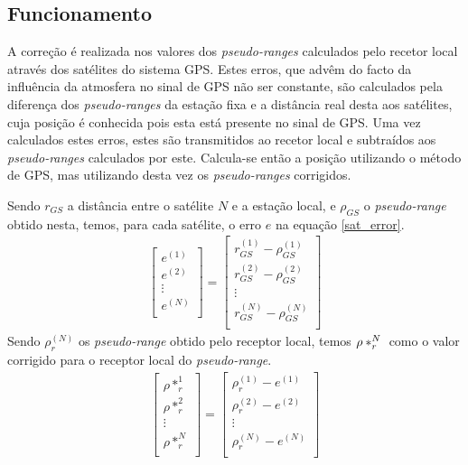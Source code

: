 \documentclass{article}
\begin{document}
\subsection{Funcionamento}

A correção é realizada nos valores dos \textit{pseudo-ranges}
calculados pelo recetor local através dos satélites do sistema GPS.
Estes erros, que advêm do facto da influência da atmosfera no sinal
de GPS não ser constante, são calculados pela diferença dos
\textit{pseudo-ranges} da estação fixa e a distância real desta aos
satélites, cuja posição é conhecida pois esta está presente no sinal
de GPS. Uma vez calculados estes erros, estes são transmitidos ao
recetor local e subtraídos aos \textit{pseudo-ranges} calculados por
este. Calcula-se então a posição utilizando o método de GPS, mas
utilizando desta vez os \textit{pseudo-ranges} corrigidos.

Sendo $r_{GS}$ a distância entre o satélite $N$ e a
estação local, e $\rho_{GS}$ o \textit{pseudo-range} obtido nesta, temos,
para cada satélite, o erro $e$ na equação \ref{sat_error}.
\begin{gather} \label{sat_error}
	\left[\begin{matrix}
		e^{(1)} \\
        e^{(2)} \\
        \vdots \\
        e^{(N)} \\
	\end{matrix}\right]
	= \left[\begin{matrix}
		r^{(1)}_{GS} - \rho^{(1)}_{GS} \\
        r^{(2)}_{GS} - \rho^{(2)}_{GS} \\
        \vdots \\
        r^{(N)}_{GS} - \rho^{(N)}_{GS} \\
	\end{matrix}\right]
\end{gather}
Sendo $\rho^{(N)}_{r}$ os \textit{pseudo-range} obtido pelo receptor local, temos $\rho*^{N}_r \\$ como o valor corrigido para o receptor local do \textit{pseudo-range}.
\begin{gather} \label{new_range}
	\left[\begin{matrix}
		\rho*^{1}_r \\
        \rho*^{2}_r \\
        \vdots \\
        \rho*^{N}_r \\
	\end{matrix}\right]
	= \left[\begin{matrix}
		\rho^{(1)}_{r} - e^{(1)} \\
        \rho^{(2)}_{r} - e^{(2)} \\
        \vdots \\
        \rho^{(N)}_{r} - e^{(N)} \\
	\end{matrix}\right]
\end{gather}
\end{document}
